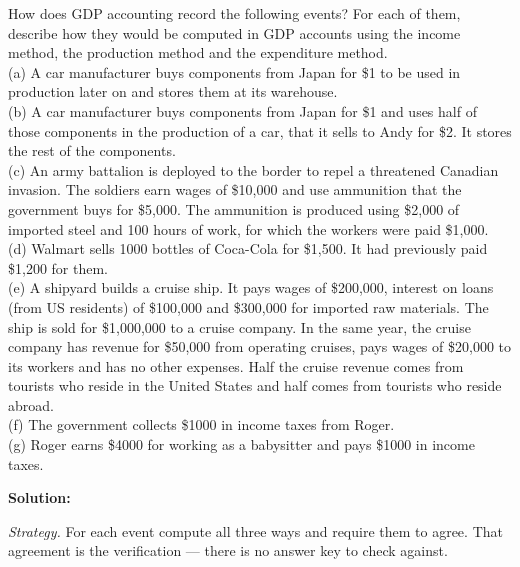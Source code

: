 \documentclass[12pt, letterpaper]{article}
\begin{document}
\begin{tcolorbox}[oddbox,title={Problem 1.1 \quad Accounting}]
\begin{tcolorbox}[questionbox]
How does GDP accounting record the following events? For each of them, describe how they
would be computed in GDP accounts using the income method, the production method and the
expenditure method.\\[3pt]
(a) A car manufacturer buys components from Japan for \$1 to be used in production later on
and stores them at its warehouse.\\
(b) A car manufacturer buys components from Japan for \$1 and uses half of those components
in the production of a car, that it sells to Andy for \$2. It stores the rest of the
components.\\
(c) An army battalion is deployed to the border to repel a threatened Canadian invasion.
The soldiers earn wages of \$10,000 and use ammunition that the government buys for \$5,000.
The ammunition is produced using \$2,000 of imported steel and 100 hours of work, for which
the workers were paid \$1,000.\\
(d) Walmart sells 1000 bottles of Coca-Cola for \$1,500. It had previously paid \$1,200 for
them.\\
(e) A shipyard builds a cruise ship. It pays wages of \$200,000, interest on loans (from US
residents) of \$100,000 and \$300,000 for imported raw materials. The ship is sold for
\$1,000,000 to a cruise company. In the same year, the cruise company has revenue for
\$50,000 from operating cruises, pays wages of \$20,000 to its workers and has no other
expenses. Half the cruise revenue comes from tourists who reside in the United States and
half comes from tourists who reside abroad.\\
(f) The government collects \$1000 in income taxes from Roger.\\
(g) Roger earns \$4000 for working as a babysitter and pays \$1000 in income taxes.
\end{tcolorbox}

\textbf{Solution:}

\emph{Strategy.} For each event compute all three ways and require them to agree. That
agreement is the verification --- there is no answer key to check against.

\begin{enumerate}


\end{enumerate}
\end{tcolorbox}
\end{document}
